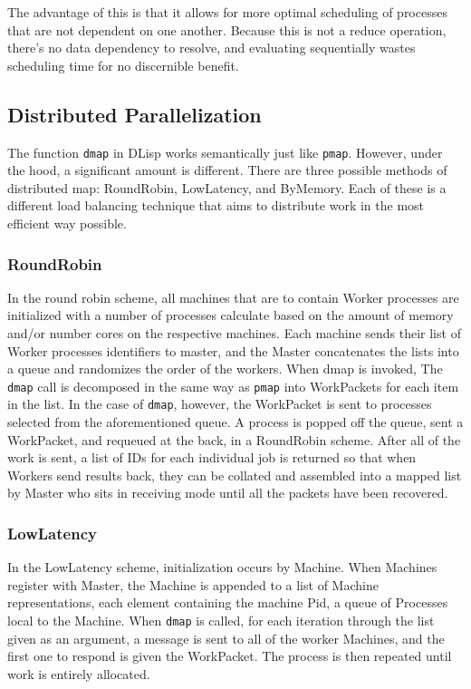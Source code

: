 \documentclass[letterpaper,twocolumn,10pt]{article}
\begin{document}
The advantage of this is that it allows for more optimal scheduling of
processes that are not dependent on one another. Because this is not a reduce
operation, there's no data dependency to resolve, and evaluating sequentially
wastes scheduling time for no discernible benefit.

\subsection{Distributed Parallelization}

The function \verb|dmap| in DLisp works semantically just like \verb|pmap|.
However, under the hood, a significant amount is different. There are three
possible methods of distributed map: RoundRobin, LowLatency, and ByMemory.
Each of these is a different load balancing technique that aims to distribute
work in the most efficient way possible.

\subsubsection{RoundRobin}

In the round robin scheme, all machines that are to contain Worker processes
are initialized with a number of processes calculate based on the amount of
memory and/or number cores on the respective machines. Each machine sends their
list of Worker processes identifiers to master, and the Master concatenates the
lists into a queue and randomizes the order of the workers.  When dmap is
invoked, The \verb|dmap| call is decomposed in the same way as \verb|pmap| into
WorkPackets for each item in the list. In the case of \verb|dmap|, however, the
WorkPacket is sent to processes selected from the aforementioned queue. A
process is popped off the queue, sent a WorkPacket, and requeued at the back,
in a RoundRobin scheme. After all of the work is sent, a list of IDs for each
individual job is returned so that when Workers send results back, they can be
collated and assembled into a mapped list by Master who sits in receiving mode
until all the packets have been recovered.

\subsubsection{LowLatency}

In the LowLatency scheme, initialization occurs by Machine. When Machines
register with Master, the Machine is appended to a list of Machine
representations, each element containing the machine Pid, a queue of Processes
local to the Machine. When \verb|dmap| is called, for each iteration through
the list given as an argument, a message is sent to all of the worker Machines,
and the first one to respond is given the WorkPacket. The process is then
repeated until work is entirely allocated.
\end{document}

